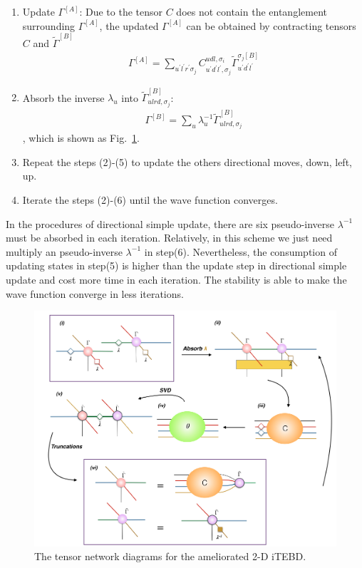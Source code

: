 \begin{enumerate}
		\item Update $\Gamma^{[A]}$: Due to the tensor $C$ does not contain the entanglement surrounding $\Gamma^{[A]}$, the updated $\Gamma^{[A]}$ can be obtained by contracting tensors $C$ and $\widetilde{\Gamma}^{[B]}$
			\begin{align}
				\Gamma^{[A]} = \sum_{u^{\prime}l^{\prime}r^{\prime}\sigma_j}{C^{udl,\sigma_i}_{u^{\prime}d^{\prime}l^{\prime},\sigma_j} \widetilde{\Gamma}^{\sigma_j [B]}_{u^{\prime}d^{\prime}l^{\prime}}}
			\end{align}
		\item Absorb the inverse $\lambda_{u}$ into $\widetilde{\Gamma}^{[B]}_{ulrd,\sigma_j}$:
			\begin{align}
				\Gamma^{[B]} = \sum_{u}{\lambda_{u}^{-1}\widetilde{\Gamma}^{[B]}_{ulrd,\sigma_j}}
			\end{align}
			, which is shown as Fig.~\ref{fig318}.
		\item Repeat the steps (2)-(5) to update the others directional moves, down, left, up.  
		\item Iterate the steps (2)-(6) until the wave function converges.
\end{enumerate}

In the procedures of directional simple update, there are six pseudo-inverse $\lambda^{-1}$ must be absorbed in each iteration. Relatively, in this scheme we just need multiply an pseudo-inverse $\lambda^{-1}$ in step(6). Nevertheless, the consumption of updating states in step(5) is higher than the update step in directional simple update and cost more time in each iteration. The stability is able to make the wave function converge in less iterations.

\begin{figure}[ht]
	\centering
	\includegraphics[width=1.00\textwidth]{figures/fig317.png}
	\caption[The tensor network diagrams for the 2-D iTEBD with QR decomposition]{The tensor network diagrams for the ameliorated 2-D iTEBD.}
	\label{fig318}
\end{figure}

